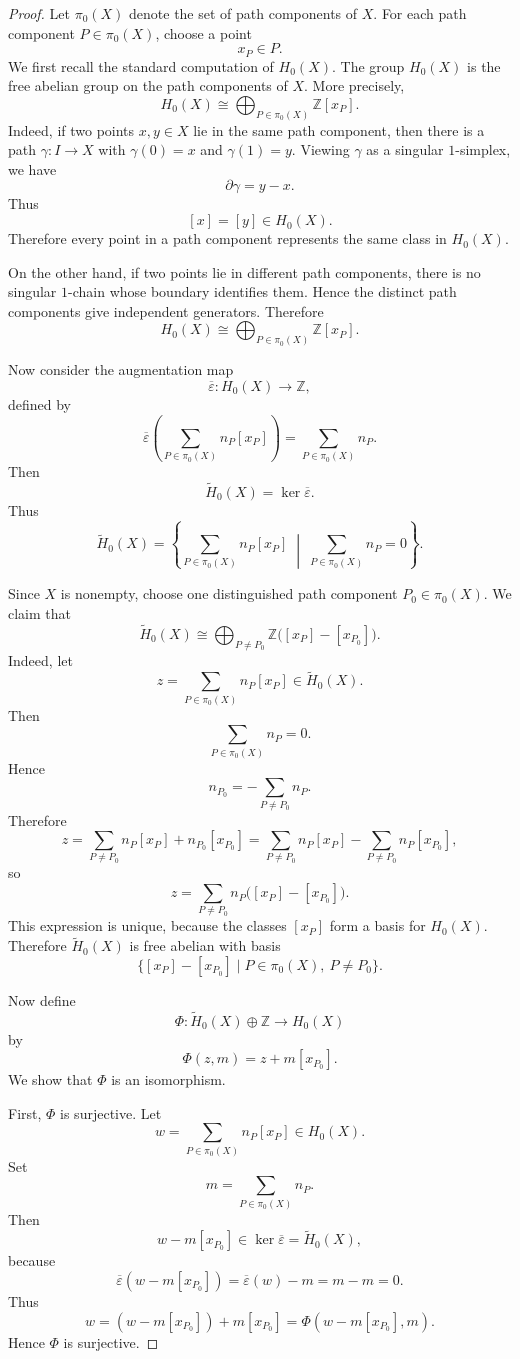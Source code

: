 \documentclass[11pt,a4paper]{article}
\theoremstyle{definition}
\theoremstyle{plain}
\theoremstyle{remark}
\newcommand{\1}{\mathbbm{1}}
\begin{document}
\begin{proof}
Let $\pi_0(X)$ denote the set of path components of $X$. For each path component
$P\in \pi_0(X)$, choose a point
\[
x_P\in P.
\]
We first recall the standard computation of $H_0(X)$. The group $H_0(X)$ is the free
abelian group on the path components of $X$. More precisely,
\[
H_0(X)\cong \bigoplus_{P\in \pi_0(X)} \mathbb Z[x_P].
\]
Indeed, if two points $x,y\in X$ lie in the same path component, then there is a path
$\gamma:I\to X$ with $\gamma(0)=x$ and $\gamma(1)=y$. Viewing $\gamma$ as a singular
$1$-simplex, we have
\[
\partial \gamma = y-x.
\]
Thus
\[
[x]=[y]\in H_0(X).
\]
Therefore every point in a path component represents the same class in $H_0(X)$.

On the other hand, if two points lie in different path components, there is no singular
$1$-chain whose boundary identifies them. Hence the distinct path components give
independent generators. Therefore
\[
H_0(X)\cong \bigoplus_{P\in \pi_0(X)} \mathbb Z[x_P].
\]

Now consider the augmentation map
\[
\overline{\varepsilon}:H_0(X)\to \mathbb Z,
\]
defined by
\[
\overline{\varepsilon}
\left(
\sum_{P\in \pi_0(X)} n_P[x_P]
\right)
=
\sum_{P\in \pi_0(X)} n_P.
\]
Then
\[
\widetilde H_0(X)=\ker \overline{\varepsilon}.
\]
Thus
\[
\widetilde H_0(X)
=
\left\{
\sum_{P\in \pi_0(X)} n_P[x_P]
\;\middle|\;
\sum_{P\in \pi_0(X)} n_P=0
\right\}.
\]

Since $X$ is nonempty, choose one distinguished path component $P_0\in \pi_0(X)$.
We claim that
\[
\widetilde H_0(X)
\cong
\bigoplus_{P\neq P_0}\mathbb Z\bigl([x_P]-[x_{P_0}]\bigr).
\]
Indeed, let
\[
z=\sum_{P\in \pi_0(X)} n_P[x_P]\in \widetilde H_0(X).
\]
Then
\[
\sum_{P\in \pi_0(X)} n_P=0.
\]
Hence
\[
n_{P_0}=-\sum_{P\neq P_0} n_P.
\]
Therefore
\[
z
=
\sum_{P\neq P_0} n_P[x_P]+n_{P_0}[x_{P_0}]
=
\sum_{P\neq P_0} n_P[x_P]
-
\sum_{P\neq P_0} n_P[x_{P_0}],
\]
so
\[
z
=
\sum_{P\neq P_0} n_P\bigl([x_P]-[x_{P_0}]\bigr).
\]
This expression is unique, because the classes $[x_P]$ form a basis for $H_0(X)$.
Therefore $\widetilde H_0(X)$ is free abelian with basis
\[
\bigl\{[x_P]-[x_{P_0}] \mid P\in \pi_0(X),\ P\neq P_0\bigr\}.
\]

Now define
\[
\Phi:\widetilde H_0(X)\oplus \mathbb Z \to H_0(X)
\]
by
\[
\Phi(z,m)=z+m[x_{P_0}].
\]
We show that $\Phi$ is an isomorphism.

First, $\Phi$ is surjective. Let
\[
w=\sum_{P\in \pi_0(X)} n_P[x_P]\in H_0(X).
\]
Set
\[
m=\sum_{P\in \pi_0(X)} n_P.
\]
Then
\[
w-m[x_{P_0}]
\in \ker \overline{\varepsilon}
=
\widetilde H_0(X),
\]
because
\[
\overline{\varepsilon}(w-m[x_{P_0}])
=
\overline{\varepsilon}(w)-m
=
m-m
=
0.
\]
Thus
\[
w
=
(w-m[x_{P_0}])+m[x_{P_0}]
=
\Phi(w-m[x_{P_0}],m).
\]
Hence $\Phi$ is surjective.


\end{proof}
\end{document}
